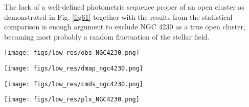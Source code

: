 \documentclass{aa}
\begin{document}
The lack of a well-defined photometric sequence proper of an open cluster as
demonstrated in Fig. \ref{fig61} together with the results from
the statistical comparison is enough argument to exclude NGC 4230 as a true open
cluster, becoming most probably a random fluctuation of the stellar field.

\begin{figure*}[ht]
    \centering
    \texttt{[image: figs/low\_res/obs\_NGC4230.png]}
    \caption{Idem Fig. \ref{fig3} for NGC 4230.}
    \label{fig59}
\end{figure*}
\begin{figure*}[ht]
    \centering
    \texttt{[image: figs/low\_res/dmap\_ngc4230.png]}
    \caption{Idem Fig. \ref{fig4} for NGC 4230.}
    \label{fig60}
\end{figure*}
\begin{figure*}[ht]
    \centering
    \texttt{[image: figs/low\_res/cmds\_ngc4230.png]}
    \caption{Idem Fig. \ref{fig5} for NGC 4230.}
    \label{fig61}
\end{figure*}
\begin{figure*}[ht]
    \centering
    \texttt{[image: figs/low\_res/plx\_NGC4230.png]}
    \caption{Idem Fig. \ref{fig6} for NGC 4230.}
    \label{fig62}
\end{figure*}
\end{document}
